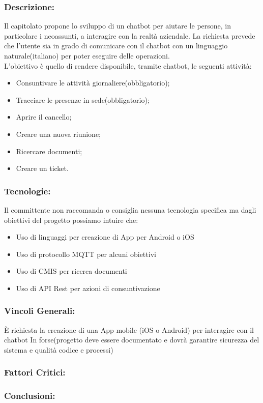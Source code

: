 \subsubsection{Descrizione:}
Il capitolato propone lo sviluppo di un chatbot per aiutare le persone, in particolare i neoassunti, a interagire con la realtà aziendale.
La richiesta prevede che l’utente sia in grado di comunicare con il chatbot con un linguaggio naturale(italiano) per poter eseguire delle operazioni. \\
L’obiettivo è quello di rendere disponibile, tramite chatbot, le seguenti attività:
\begin{itemize}
	\item Consuntivare le attività giornaliere(obbligatorio);
	\item Tracciare le presenze in sede(obbligatorio);
	\item Aprire il cancello;
	\item Creare una nuova riunione;
	\item Ricercare documenti;
	\item Creare un ticket.
	
\end{itemize}

\subsubsection{Tecnologie:}
Il committente non raccomanda o consiglia nessuna tecnologia specifica ma dagli obiettivi del progetto possiamo intuire che:
\begin{itemize}
	\item Uso di linguaggi per creazione di App per Android o iOS
	\item Uso di protocollo MQTT per alcuni obiettivi
	\item Uso di CMIS per ricerca documenti
	\item Uso di API Rest per azioni di consuntivazione  
\end{itemize}

\subsubsection{Vincoli Generali:}
È richiesta la creazione di una App mobile (iOS o Android) per interagire con il chatbot
In forse(progetto deve essere documentato e dovrà garantire sicurezza del sistema e qualità codice e processi)


\subsubsection{Fattori Critici:}

\subsubsection{Conclusioni:}
